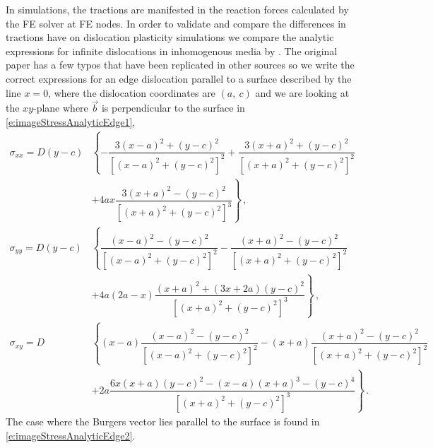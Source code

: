 \documentclass[11pt]{iopart}
\begin{document}
In simulations, the tractions are manifested in the reaction forces calculated by the FE solver at FE nodes. In order to validate and compare the differences in tractions have on dislocation plasticity simulations we compare the analytic expressions for infinite dislocations in inhomogenous media by \citet{head1953edge}. The original paper has a few typos that have been replicated in other sources so we write the correct expressions for an edge dislocation parallel to a surface described by the line $x = 0$, where the dislocation coordinates are $(a,~c)$ and we are looking at the $xy$-plane where $\vec{b}$ is perpendicular to the surface in \cref{e:imageStressAnalyticEdge1},
\begin{subequations}
    \begin{align}\label{e:imageStressAnalyticEdge1}
        \sigma_{xx} = D (y - c) & \left\{-\dfrac{3 (x - a)^2 + (y - c)^2}{[(x - a)^2 + (y - c)^2]^2} + \dfrac{3 (x + a)^2 + (y - c)^2}{[(x + a)^2 + (y - c)^2]^2}\right.                                             \\\nonumber
                                & \left. + 4 a x \dfrac{3 (x + a)^2 - (y - c)^2}{[(x + a)^2 + (y - c)^2]^3}\right\}\,,                                                                                               \\
        \sigma_{yy} = D (y - c) & \left\{\dfrac{(x - a)^2 - (y - c)^2}{[(x - a)^2 + (y - c)^2]^2} - \dfrac{(x + a)^2 - (y - c)^2}{[(x + a)^2 + (y - c)^2]^2}                                                 \right. \\\nonumber
                                & \left. + 4 a (2 a - x) \dfrac{(x + a)^2 + (3 x + 2 a) (y - c)^2}{[(x + a)^2 + (y - c)^2]^3}\right\}\,,                                                                             \\
        \sigma_{xy} = D         & \left\{(x - a) \dfrac{(x - a)^2 - (y - c)^2}{[(x - a)^2 + (y - c)^2]^2} - (x + a) \dfrac{(x + a)^2 - (y - c)^2}{[(x + a)^2 + (y - c)^2]^2}\right.                                  \\\nonumber
                                & \left. + 2 a \dfrac{6 x (x + a) (y - c)^2 - (x - a) (x + a)^3 - (y - c)^4}{[(x + a)^2 + (y - c)^2]^3}\right\}\,.
    \end{align}
\end{subequations}
The case where the Burgers vector lies parallel to the surface is found in \cref{e:imageStressAnalyticEdge2}.
\end{document}
